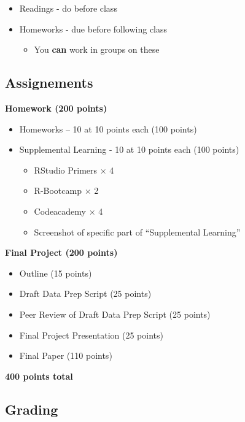\documentclass[
  letterpaper,
  DIV=11,
  numbers=noendperiod,
  oneside]{scrartcl}
\providecommand{\tightlist}{%
  \setlength{\itemsep}{0pt}\setlength{\parskip}{0pt}}\usepackage{longtable,booktabs,array}
\begin{document}
\begin{itemize}
\tightlist
\item
  Readings - do before class
\item
  Homeworks - due before following class

  \begin{itemize}
  \tightlist
  \item
    You \textbf{can} work in groups on these
  \end{itemize}
\end{itemize}

\hypertarget{assignements}{%
\subsection{Assignements}\label{assignements}}

\textbf{Homework (200 points)}

\begin{itemize}
\tightlist
\item
  Homeworks -- 10 at 10 points each (100 points)
\item
  Supplemental Learning - 10 at 10 points each (100 points)

  \begin{itemize}
  \tightlist
  \item
    RStudio Primers \(\times\) 4
  \item
    R-Bootcamp \(\times\) 2
  \item
    Codeacademy \(\times\) 4
  \item
    Screenshot of specific part of ``Supplemental Learning''
  \end{itemize}
\end{itemize}

\textbf{Final Project (200 points)}

\begin{itemize}
\tightlist
\item
  Outline (15 points)
\item
  Draft Data Prep Script (25 points)
\item
  Peer Review of Draft Data Prep Script (25 points)
\item
  Final Project Presentation (25 points)
\item
  Final Paper (110 points)
\end{itemize}

\textbf{400 points total}

\hypertarget{grading}{%
\subsection{Grading}\label{grading}}
\end{document}
